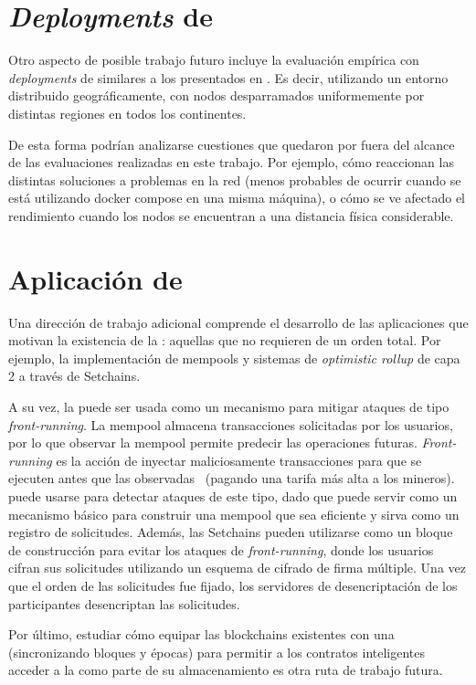 \section{\textit{Deployments} de \hashchain}
Otro aspecto de posible trabajo futuro incluye la evaluación empírica con
\textit{deployments}
de \hashchain similares a los presentados en \cite{tendermint.design}.
Es decir, utilizando un entorno distribuido geográficamente, con nodos desparramados
uniformemente por distintas regiones en todos los continentes.

De esta forma podrían analizarse cuestiones que quedaron por fuera del alcance de las
evaluaciones realizadas en este trabajo. Por ejemplo, cómo reaccionan las distintas
soluciones a problemas en la red (menos probables de ocurrir cuando se está utilizando
docker compose en una misma máquina), o cómo se ve afectado el rendimiento cuando
los nodos se encuentran a una distancia física considerable. 

\section{Aplicación de \hashchain}
Una dirección de trabajo adicional comprende el desarrollo de las
aplicaciones que motivan la existencia de la \setchain: aquellas que no requieren de
un orden total.
Por ejemplo, la implementación de mempools y sistemas de
\textit{optimistic rollup} de capa 2 a través de Setchains.

A su vez, la \setchain puede ser usada como un mecanismo para mitigar ataques de tipo
\textit{front-running}. La mempool almacena transacciones solicitadas por los usuarios,
por lo que observar
la mempool permite predecir las operaciones futuras. \emph{Front-running} es la acción
de inyectar maliciosamente transacciones
para que se ejecuten antes que las observadas~\cite{Daian2020FlashBoys, Ferreira2021Frontrunner}
(pagando una tarifa más alta a los mineros).
%
\setchain puede usarse para detectar ataques de este tipo, dado que puede servir
como un
mecanismo básico para construir una mempool que sea eficiente y sirva como un registro de
solicitudes.
%
Además, las Setchains pueden utilizarse como un bloque de construcción para
evitar los ataques de \textit{front-running}, donde los usuarios cifran sus solicitudes
utilizando un esquema de
cifrado de firma múltiple.
%
Una vez que el orden de las solicitudes fue fijado, los servidores
de desencriptación de los participantes desencriptan
las solicitudes.

%
Por último, estudiar cómo equipar las blockchains existentes con una \setchain (sincronizando bloques
y épocas) para permitir a los contratos inteligentes acceder a la \setchain como parte de su almacenamiento
es otra ruta de trabajo futura.